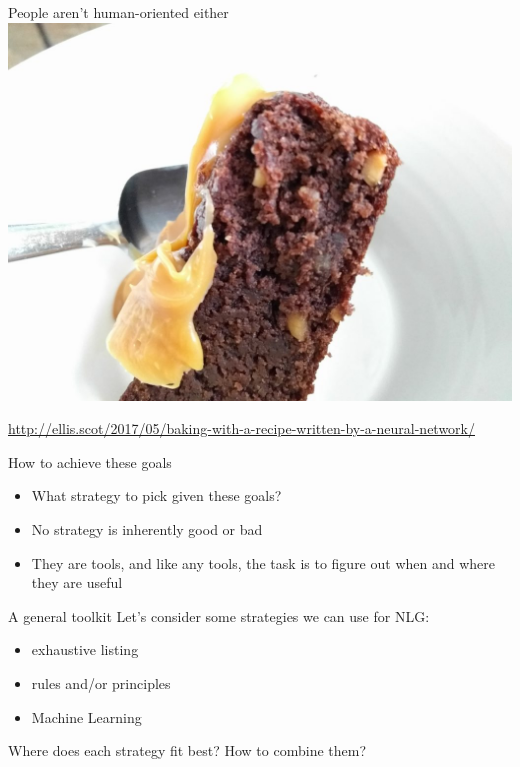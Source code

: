 \documentclass[10pt, compress]{beamer}
\begin{document}
\begin{frame}{People aren't human-oriented either}
	\includegraphics[width=.9\textwidth]{images/AIcake.jpg}

	{\tiny \href{http://ellis.scot/2017/05/baking-with-a-recipe-written-by-a-neural-network/}{http://ellis.scot/2017/05/baking-with-a-recipe-written-by-a-neural-network/}}
\end{frame}

\begin{frame}{How to achieve these goals}
	\begin{itemize}
		\item What strategy to pick given these goals?	\pause
		\item No strategy is inherently good or bad \pause
		\item They are tools, and like any tools, the task is to figure out when and where they are useful
	\end{itemize}
\end{frame}

\begin{frame}{A general toolkit}
	Let's consider some strategies we can use for NLG: \pause

	\begin{itemize}
		\item exhaustive listing \pause
		\item rules and/or principles \pause
		\item Machine Learning \pause
	\end{itemize}

	\pause

	Where does each strategy fit best? How to combine them?
\end{frame}
\end{document}
